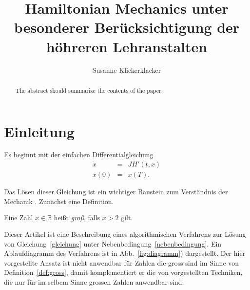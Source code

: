 \documentclass{llncs}
\begin{document}
\title{Hamiltonian Mechanics unter besonderer Ber\"ucksichtigung der h\"ohreren Lehranstalten}
\author{Susanne Klickerklacker}
\maketitle								%

\begin{abstract}
The abstract should summarize the contents of the paper.
\end{abstract}
%
\section{Einleitung}
%
Es beginnt mit der einfachen Differentialgleichung
\begin{eqnarray}
  \dot{x}&=&JH' (t,x)\label{gleichung} \\
  x(0)   &=& x(T). \label{nebenbedingung}
\end{eqnarray}

Das Lösen dieser Gleichung ist ein wichtiger Baustein zum Verständnis der Mechanik \cite{mechanics}.
Zunächst eine Definition.

\begin{definition}
Eine Zahl $x \in \mathbb{R}$ heißt \emph{groß}, falls $x>2$ gilt.
\label{def:gross}
\end{definition}

Dieser Artikel ist eine Beschreibung eines algorithmischen Verfahrens zur Lösung von Gleichung~\ref{gleichung} unter Nebenbedingung~\ref{nebenbedingung}. 
Ein Ablaufdiagramm des Verfahrens ist in Abb.~\ref{fig:diagramm}) dargestellt. 
Der hier vorgestellte Ansatz ist nicht anwendbar für Zahlen die gross sind im Sinne von Definition~\ref{def:gross}, damit komplementiert er die von  vorgestellten Techniken, die nur für im selbem Sinne grossen Zahlen anwendbar sind.
\end{document}
